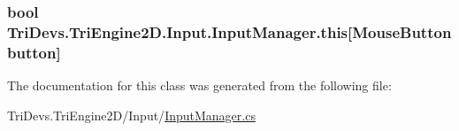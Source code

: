 \hypertarget{class_tri_devs_1_1_tri_engine2_d_1_1_input_1_1_input_manager_abe6100586cfcbfecf8197274dddf6d91}{
\subsubsection[{this[Mouse\-Button button]}]{\setlength{\rightskip}{0pt plus 5cm}bool Tri\-Devs.\-Tri\-Engine2\-D.\-Input.\-Input\-Manager.\-this\mbox{[}Mouse\-Button button\mbox{]}\hspace{0.3cm}{\ttfamily [get]}}}\label{class_tri_devs_1_1_tri_engine2_d_1_1_input_1_1_input_manager_abe6100586cfcbfecf8197274dddf6d91}


The documentation for this class was generated from the following file\-:\begin{DoxyCompactItemize}
\item 
Tri\-Devs.\-Tri\-Engine2\-D/\-Input/\hyperlink{_input_manager_8cs}{Input\-Manager.\-cs}\end{DoxyCompactItemize}
